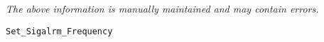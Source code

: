 \label{pkg:set\_sigalrm\_frequency}

{\tiny \it The above information is manually maintained and may contain errors.}
\begin{verbatim}
Set_Sigalrm_Frequency
\end{verbatim}
